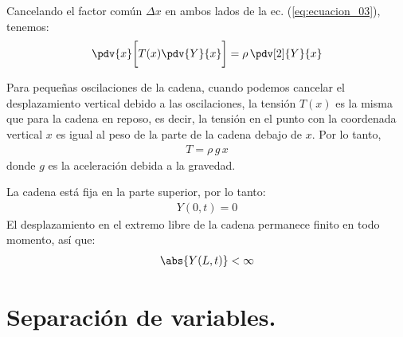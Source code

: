 Cancelando el factor común $\Delta x$ en ambos lados de la ec. (\ref{eq:ecuacion_03}), tenemos:
\begin{align}
\pdv{x} \bigg[ T (x) \pdv{Y}{x} \bigg] = \rho \, \pdv[2]{Y}{x}
\label{eq:ecuacion_04}
\end{align}

Para pequeñas oscilaciones de la cadena, cuando podemos cancelar el desplazamiento vertical debido a las oscilaciones, la tensión $T (x)$ es la misma que para la cadena en reposo, es decir, la tensión en el punto con la coordenada vertical $x$ es igual al peso de la parte de la cadena debajo de $x$. Por lo tanto,
\begin{align}
T = \rho \, g \, x
\label{eq:ecuacion_05}
\end{align}
donde $g$ es la aceleración debida a la gravedad.
\par
La cadena está fija en la parte superior, por lo tanto:
\begin{align}
Y (0, t) = 0
\label{eq:ecuacion_06}
\end{align}
El desplazamiento en el extremo libre de la cadena permanece finito en todo momento, así que:
\begin{align}
\abs{Y (L, t)} < \infty
\label{eq:ecuacion_07}
\end{align}

\section{Separación de variables.}

